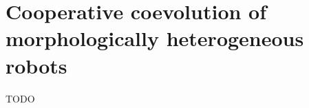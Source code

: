 \section{Cooperative coevolution of morphologically heterogeneous robots \cite{gomes2015cooperative}}

\begin{frame}{TODO}

\end{frame}
